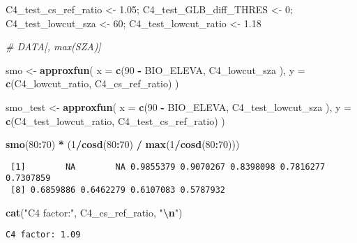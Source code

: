 \documentclass[
  10pt,
  a4paper,oneside]{article}
\newenvironment{Shaded}{\begin{snugshade}}{\end{snugshade}}
\newcommand{\AttributeTok}[1]{\textcolor[rgb]{0.13,0.29,0.53}{#1}}
\newcommand{\CommentTok}[1]{\textcolor[rgb]{0.56,0.35,0.01}{\textit{#1}}}
\newcommand{\DecValTok}[1]{\textcolor[rgb]{0.00,0.00,0.81}{#1}}
\newcommand{\FloatTok}[1]{\textcolor[rgb]{0.00,0.00,0.81}{#1}}
\newcommand{\FunctionTok}[1]{\textcolor[rgb]{0.13,0.29,0.53}{\textbf{#1}}}
\newcommand{\NormalTok}[1]{#1}
\newcommand{\OtherTok}[1]{\textcolor[rgb]{0.56,0.35,0.01}{#1}}
\newcommand{\SpecialCharTok}[1]{\textcolor[rgb]{0.81,0.36,0.00}{\textbf{#1}}}
\newcommand{\StringTok}[1]{\textcolor[rgb]{0.31,0.60,0.02}{#1}}
\begin{document}
\begin{Shaded}
\begin{Highlighting}[]
\NormalTok{C4\_test\_cs\_ref\_ratio   }\OtherTok{\textless{}{-}} \FloatTok{1.05}\NormalTok{;}
\NormalTok{C4\_test\_GLB\_diff\_THRES }\OtherTok{\textless{}{-}}  \DecValTok{0}\NormalTok{;}
\NormalTok{C4\_test\_lowcut\_sza     }\OtherTok{\textless{}{-}} \DecValTok{60}\NormalTok{;}
\NormalTok{C4\_test\_lowcut\_ratio   }\OtherTok{\textless{}{-}} \FloatTok{1.18}

\CommentTok{\# DATA[, max(SZA)]}

\NormalTok{smo }\OtherTok{\textless{}{-}} \FunctionTok{approxfun}\NormalTok{(}
  \AttributeTok{x =} \FunctionTok{c}\NormalTok{(}\DecValTok{90} \SpecialCharTok{{-}}\NormalTok{ BIO\_ELEVA,  C4\_lowcut\_sza  ),}
  \AttributeTok{y =} \FunctionTok{c}\NormalTok{(C4\_lowcut\_ratio, C4\_cs\_ref\_ratio)}
\NormalTok{)}

\NormalTok{smo\_test }\OtherTok{\textless{}{-}} \FunctionTok{approxfun}\NormalTok{(}
  \AttributeTok{x =} \FunctionTok{c}\NormalTok{(}\DecValTok{90} \SpecialCharTok{{-}}\NormalTok{ BIO\_ELEVA,       C4\_test\_lowcut\_sza  ),}
  \AttributeTok{y =} \FunctionTok{c}\NormalTok{(C4\_test\_lowcut\_ratio, C4\_test\_cs\_ref\_ratio)}
\NormalTok{)}

\FunctionTok{smo}\NormalTok{(}\DecValTok{80}\SpecialCharTok{:}\DecValTok{70}\NormalTok{) }\SpecialCharTok{*}\NormalTok{ (}\DecValTok{1}\SpecialCharTok{/}\FunctionTok{cosd}\NormalTok{(}\DecValTok{80}\SpecialCharTok{:}\DecValTok{70}\NormalTok{) }\SpecialCharTok{/} \FunctionTok{max}\NormalTok{(}\DecValTok{1}\SpecialCharTok{/}\FunctionTok{cosd}\NormalTok{(}\DecValTok{80}\SpecialCharTok{:}\DecValTok{70}\NormalTok{)))}
\end{Highlighting}
\end{Shaded}

\begin{verbatim}
 [1]        NA        NA 0.9855379 0.9070267 0.8398098 0.7816277 0.7307859
 [8] 0.6859886 0.6462279 0.6107083 0.5787932
\end{verbatim}

\begin{Shaded}
\begin{Highlighting}[]
\FunctionTok{cat}\NormalTok{(}\StringTok{"C4 factor:"}\NormalTok{, C4\_cs\_ref\_ratio,   }\StringTok{"}\SpecialCharTok{\textbackslash{}n}\StringTok{"}\NormalTok{)}
\end{Highlighting}
\end{Shaded}

\begin{verbatim}
C4 factor: 1.09 
\end{verbatim}
\end{document}
